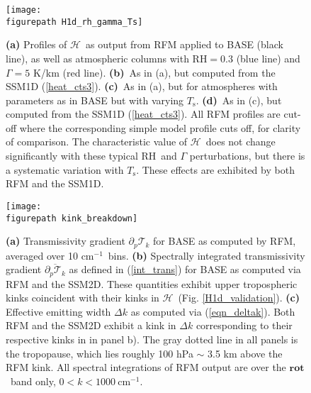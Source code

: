 \documentclass{ametsoc}
\newcommand{\eqnref}[1]{(\ref{#1})}
\newcommand{\cminverse}{\ensuremath{\mathrm{cm^{-1}}}}
\newcommand{\ppp}{\ensuremath{\partial_p}}
\newcommand{\Ts}{\ensuremath{T_\mathrm{s}}}
\newcommand{\RH}{\ensuremath{\mathrm{RH}}}
\newcommand{\trans}{\ensuremath{\mathcal{T}}}
\newcommand{\ch}{\ensuremath{\mathcal{H}}}
\newcommand{\konerot}{\ensuremath{k_{1,\mathrm{rot}}}}
\newcommand{\konej}{\ensuremath{k_{1,j}}}
\newcommand{\rot}{\ensuremath{\textbf{rot}}}
\newcommand{\figurepath}{./}
\begin{document}
\begin{figure}[h]
	\begin{center}
			\texttt{[image: \\figurepath H1d\_rh\_gamma\_Ts]}
		\caption{\textbf{(a)} Profiles of \ch\ as output from RFM applied to BASE (black line), as well as atmospheric columns with $\RH=0.3$ (blue line) and $\Gamma=5$ K/km (red line). 
					\textbf{(b)}\ As in (a), but computed from the SSM1D \eqnref{heat_cts3}. 
					\textbf{(c)}\ As in (a), but for atmospheres with parameters as in BASE but with varying \Ts.
					\textbf{(d)}\ As in (c), but computed from the SSM1D \eqnref{heat_cts3}. 
					All RFM profiles are cut-off where the corresponding simple model profile cuts off, for clarity of comparison. The characteristic value of \ch\   does not change significantly with these typical \RH\ and $\Gamma$ perturbations, but there is a systematic variation with \Ts. These effects are exhibited by both RFM and the SSM1D.
		\label{H1d_rh_gamma_Ts}
		}
	\end{center}
\end{figure}


\begin{figure}[h]
	\begin{center}
			\texttt{[image: \\figurepath kink\_breakdown]}
		\caption{\textbf{(a)} Transmissivity gradient $\ppp\trans_k$ for BASE as computed by RFM, averaged over 10 \cminverse\  bins.
					\textbf{(b)} Spectrally integrated transmissivity gradient $\overline{\ppp\trans_k}$ as defined in \eqnref{int_trans} for  BASE  as computed via RFM and the SSM2D. These quantities exhibit  upper tropospheric kinks coincident with their kinks in \ch\ (Fig. \ref{H1d_validation}). 
					\textbf{(c)} Effective emitting width $\Delta k$ as computed via \eqnref{eqn_deltak}. Both RFM and the SSM2D exhibit a kink in $\Delta k$ corresponding to their respective kinks in  in panel b).
					The gray dotted line in all panels is the tropopause, which lies roughly 100 hPa $\sim$ 3.5 km above the RFM kink. All spectral integrations of RFM output are  over the \rot\ band only, $0<k<1000\ \cminverse$. 
			\label{kink_breakdown}
		}
	\end{center}
\end{figure}
\end{document}
